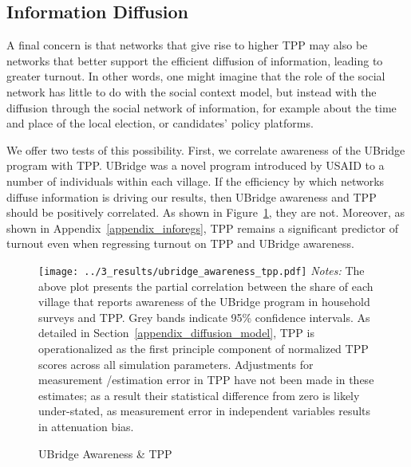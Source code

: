 \documentclass[12pt]{article}
\begin{document}

\subsection{Information Diffusion}

A final concern is that networks that give rise to higher TPP may also be networks that better support the efficient diffusion of information, leading to greater turnout. In other words, one might imagine that the role of the social network has little to do with the social context model, but instead with the diffusion through the social network of information, for example about the time and place of the local election, or candidates' policy platforms.

We offer two tests of this possibility. First, we correlate awareness of the UBridge program with TPP. UBridge was a novel program introduced by USAID to a number of individuals within each village. If the efficiency by which networks diffuse information is driving our results, then UBridge awareness and TPP should be positively correlated. As shown in Figure~\ref{figure_ubridge_turnout}, they are not. Moreover, as shown in Appendix~\ref{appendix_inforegs}, TPP remains a significant predictor of turnout even when regressing turnout on TPP and UBridge awareness.



\begin{figure}[!h]
    \caption{UBridge Awareness \& TPP}\label{figure_ubridge_turnout}
    \texttt{[image: ../3\_results/ubridge\_awareness\_tpp.pdf]}
	\scriptsize{\emph{Notes:} The above plot presents the partial correlation between the share of each village that reports awareness of the UBridge program in household surveys and TPP.  Grey bands indicate 95\% confidence intervals. As detailed in Section~\ref{appendix_diffusion_model}, TPP is operationalized as the first principle component of normalized TPP scores across all simulation parameters. Adjustments for measurement /estimation error in TPP have not been made in these estimates; as a result their statistical difference from zero is likely under-stated, as measurement error in independent variables results in attenuation bias.}
\end{figure}
\end{document}

